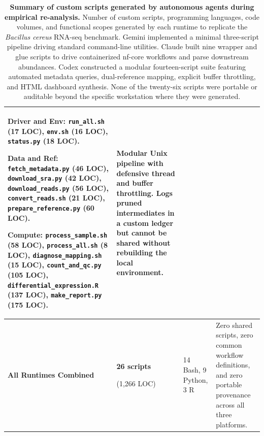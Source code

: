 \documentclass[11pt,letterpaper]{article}
\begin{document}
\begin{table}[!htbp]
\begin{tabularx}{\textwidth}{p{2.8cm}p{2.2cm}XX}
\textbf{Driver and Env:} \texttt{run\_all.sh} (17 LOC), \texttt{env.sh} (16 LOC), \texttt{status.py} (18 LOC). \par
\textbf{Data and Ref:} \texttt{fetch\_metadata.py} (46 LOC), \texttt{download\_sra.py} (42 LOC), \texttt{download\_reads.py} (56 LOC), \texttt{convert\_reads.sh} (21 LOC), \texttt{prepare\_reference.py} (60 LOC). \par
\textbf{Compute:} \texttt{process\_sample.sh} (58 LOC), \texttt{process\_all.sh} (8 LOC), \texttt{diagnose\_mapping.sh} (15 LOC), \texttt{count\_and\_qc.py} (105 LOC), \texttt{differential\_expression.R} (137 LOC), \texttt{make\_report.py} (175 LOC). &
Modular Unix pipeline with defensive thread and buffer throttling. Logs pruned intermediates in a custom ledger but cannot be shared without rebuilding the local environment. \\
\midrule
\textbf{All Runtimes Combined} & \textbf{26 scripts} \par (1,266 LOC) & 14 Bash, 9 Python, 3 R & Zero shared scripts, zero common workflow definitions, and zero portable provenance across all three platforms. \\
\bottomrule
\end{tabularx}
\caption{\textbf{Summary of custom scripts generated by autonomous agents during empirical re-analysis.} Number of custom scripts, programming languages, code volumes, and functional scopes generated by each runtime to replicate the \textit{Bacillus cereus} RNA-seq benchmark. Gemini implemented a minimal three-script pipeline driving standard command-line utilities. Claude built nine wrapper and glue scripts to drive containerized nf-core workflows and parse downstream abundances. Codex constructed a modular fourteen-script suite featuring automated metadata queries, dual-reference mapping, explicit buffer throttling, and HTML dashboard synthesis. None of the twenty-six scripts were portable or auditable beyond the specific workstation where they were generated.}
\label{tab:agent_scripts}
\end{table}

\clearpage
\end{document}
